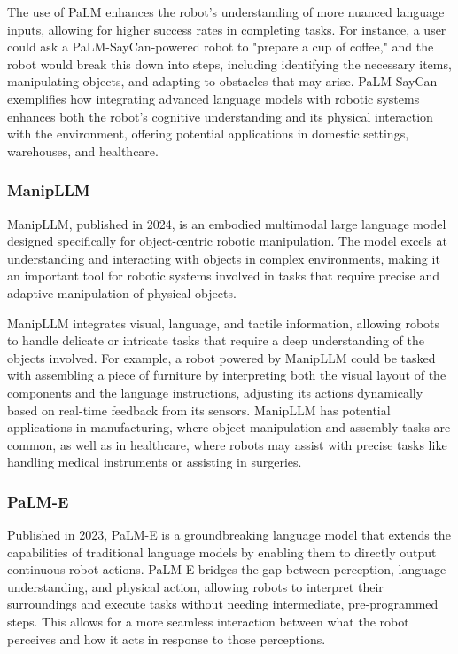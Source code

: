 The use of PaLM enhances the robot's understanding of more nuanced language inputs, allowing for higher success rates in completing tasks. 
For instance, a user could ask a PaLM-SayCan-powered robot to "prepare a cup of coffee," and the robot would break this down into steps, including identifying the necessary items, manipulating objects, and adapting to obstacles that may arise. 
PaLM-SayCan exemplifies how integrating advanced language models with robotic systems enhances both the robot’s cognitive understanding and its physical interaction with the environment, offering potential applications in domestic settings, warehouses, and healthcare.

\subsubsection{ManipLLM}

ManipLLM, published in 2024, is an embodied multimodal large language model designed specifically for object-centric robotic manipulation. 
The model excels at understanding and interacting with objects in complex environments, making it an important tool for robotic systems involved in tasks that require precise and adaptive manipulation of physical objects.

ManipLLM integrates visual, language, and tactile information, allowing robots to handle delicate or intricate tasks that require a deep understanding of the objects involved. 
For example, a robot powered by ManipLLM could be tasked with assembling a piece of furniture by interpreting both the visual layout of the components and the language instructions, adjusting its actions dynamically based on real-time feedback from its sensors. 
ManipLLM has potential applications in manufacturing, where object manipulation and assembly tasks are common, as well as in healthcare, where robots may assist with precise tasks like handling medical instruments or assisting in surgeries.

\subsubsection{PaLM-E}

Published in 2023, PaLM-E is a groundbreaking language model that extends the capabilities of traditional language models by enabling them to directly output continuous robot actions. 
PaLM-E bridges the gap between perception, language understanding, and physical action, allowing robots to interpret their surroundings and execute tasks without needing intermediate, pre-programmed steps. 
This allows for a more seamless interaction between what the robot perceives and how it acts in response to those perceptions.

